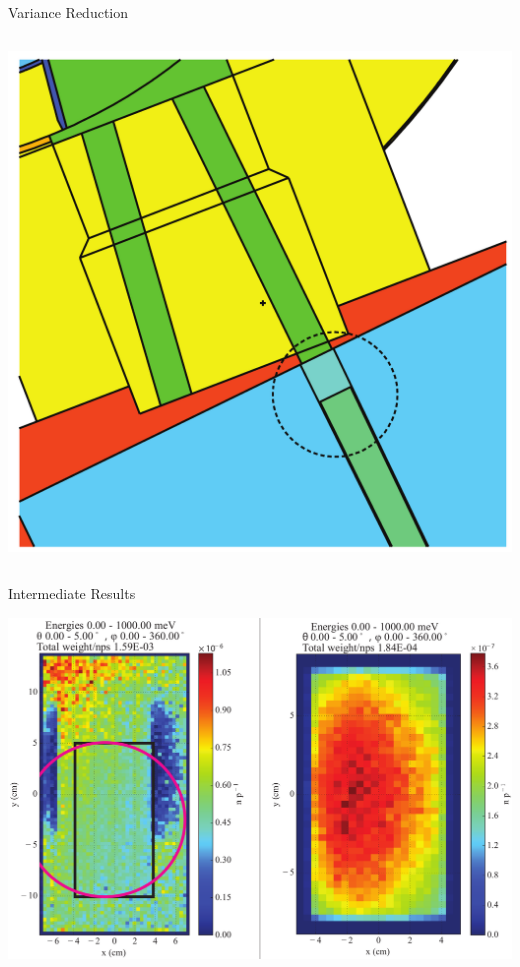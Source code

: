 \documentclass[final,t]{beamer}
\begin{document}
\begin{frame}{}
\begin{columns}[t]
\begin{column}{.3\linewidth}
\begin{block}{Variance Reduction}
\begin{columns}
\begin{column}{0.5\linewidth}
      \begin{center}
      \includegraphics*[width=.85\linewidth]{crystal.pdf}
      \end{center}
      
      \end{column}

      \end{columns}

      \end{block}

      \begin{block}{Intermediate Results}
      \begin{center}
      \includegraphics*[width=\linewidth]{dists.pdf}
      \end{center}


\end{block}
\end{column}
\end{columns}
\end{frame}
\end{document}
